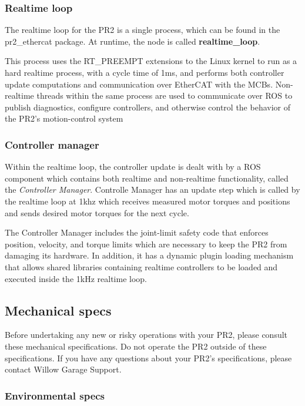 \subsubsection{Realtime loop}
The realtime loop for the PR2 is a single process, which can be found in the pr2\_ethercat package.  At runtime, the node is called {\bf realtime\_loop}.

This process uses the RT\_PREEMPT extensions to the Linux kernel to run as a hard realtime process, with a cycle time of 1ms, and performs both controller update computations and communication over EtherCAT with the MCBs.  Non-realtime threads within the same process are used to communicate over ROS to publish diagnostics, configure controllers, and otherwise control the behavior of the PR2's motion-control system

\subsubsection{Controller manager}  
Within the realtime loop, the controller update is dealt with by a ROS component which contains both realtime and non-realtime functionality,
called the \emph{Controller Manager}.  Controlle Manager has an update step which
is called by the realtime loop at 1khz which receives measured motor torques and positions and sends
desired motor torques for the next cycle.

The Controller Manager includes the joint-limit safety code that enforces position, velocity, and torque limits
which are necessary to keep the PR2 from damaging its hardware.  In addition, it has a
dynamic plugin loading mechanism that allows shared libraries containing realtime controllers to be loaded
and executed inside the 1kHz realtime loop.

\subsection{Mechanical specs}

Before undertaking any new or risky operations with your PR2, please consult
these mechanical specifications. Do not operate the PR2 outside of these
specifications. If you have any questions about your PR2's specifications,
please contact Willow Garage Support.

\subsubsection{Environmental specs}

